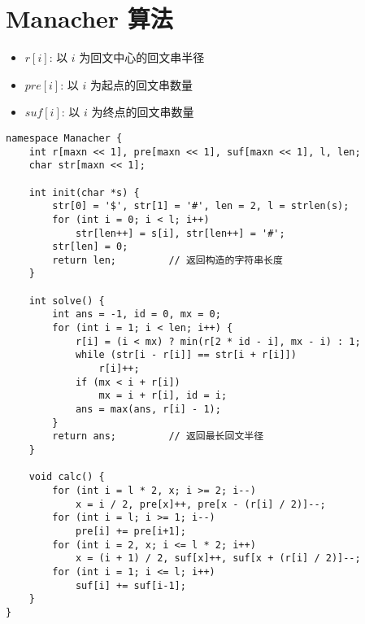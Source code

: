 \section{Manacher 算法}
\begin{itemize}
    \item $r[i]$: 以 $i$ 为回文中心的回文串半径
    \item $pre[i]$: 以 $i$ 为起点的回文串数量
    \item $suf[i]$: 以 $i$ 为终点的回文串数量
\end{itemize}
\begin{verbatim}
namespace Manacher {
    int r[maxn << 1], pre[maxn << 1], suf[maxn << 1], l, len;
    char str[maxn << 1];

    int init(char *s) {
        str[0] = '$', str[1] = '#', len = 2, l = strlen(s);
        for (int i = 0; i < l; i++)
            str[len++] = s[i], str[len++] = '#';
        str[len] = 0;
        return len;         // 返回构造的字符串长度
    }
    
    int solve() {
        int ans = -1, id = 0, mx = 0;
        for (int i = 1; i < len; i++) {
            r[i] = (i < mx) ? min(r[2 * id - i], mx - i) : 1;
            while (str[i - r[i]] == str[i + r[i]])
                r[i]++;
            if (mx < i + r[i])
                mx = i + r[i], id = i;
            ans = max(ans, r[i] - 1);
        }
        return ans;         // 返回最长回文半径
    }

    void calc() {
        for (int i = l * 2, x; i >= 2; i--)
            x = i / 2, pre[x]++, pre[x - (r[i] / 2)]--;
        for (int i = l; i >= 1; i--)
            pre[i] += pre[i+1];
        for (int i = 2, x; i <= l * 2; i++)
            x = (i + 1) / 2, suf[x]++, suf[x + (r[i] / 2)]--;
        for (int i = 1; i <= l; i++)
            suf[i] += suf[i-1];
    }
}
\end{verbatim}